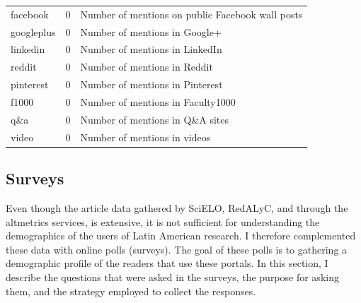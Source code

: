 \begin{longtable}{@{}lp{5cm}p{6cm}@{}}
facebook           & 0                                                                                & Number of mentions on public Facebook wall posts                     \\
googleplus         & 0                                                                                & Number of mentions in Google+                                        \\
linkedin           & 0                                                                                & Number of mentions in LinkedIn                                       \\
reddit             & 0                                                                                & Number of mentions in Reddit                                         \\
pinterest          & 0                                                                                & Number of mentions in Pinterest                                      \\
f1000              & 0                                                                                & Number of mentions in Faculty1000                                    \\
q\&a               & 0                                                                                & Number of mentions in Q\&A sites                                     \\
video              & 0                                                                                & Number of mentions in videos                                         \\ \end{longtable}



\subsection{Surveys}
\label{surveys}

Even though the article data gathered by SciELO, RedALyC, and through the altmetrics services, is extensive, it is not sufficient for understanding the demographics of the users of Latin American research. I therefore complemented these data with online polls (surveys). The goal of these polls is to gathering a demographic profile of the readers that use these portals. In this section, I describe the questions that were asked in the surveys, the purpose for asking them, and the strategy employed to collect the responses.

